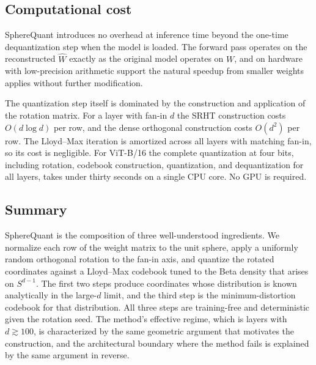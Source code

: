 \subsection{Computational cost}
\label{sec:method-cost}

SphereQuant introduces no overhead at inference time beyond the one-time
dequantization step when the model is loaded. The forward pass operates on
the reconstructed $\widehat{W}$ exactly as the original model operates on
$W$, and on hardware with low-precision arithmetic support the natural
speedup from smaller weights applies without further modification.

The quantization step itself is dominated by the construction and
application of the rotation matrix. For a layer with fan-in $d$ the SRHT
construction costs $O(d \log d)$ per row, and the dense orthogonal
construction costs $O(d^2)$ per row. The Lloyd--Max iteration is amortized
across all layers with matching fan-in, so its cost is negligible. For
ViT-B/16 the complete quantization at four bits, including rotation,
codebook construction, quantization, and dequantization for all layers,
takes under thirty seconds on a single CPU core. No GPU is required.

\subsection{Summary}
\label{sec:method-summary}

SphereQuant is the composition of three well-understood ingredients. We normalize
each row of the weight matrix to the unit sphere, apply a uniformly
random orthogonal rotation to the fan-in axis, and quantize the rotated
coordinates against a Lloyd--Max codebook tuned to the Beta density that
arises on $S^{d-1}$. The first two steps produce coordinates whose
distribution is known analytically in the large-$d$ limit, and the third
step is the minimum-distortion codebook for that distribution. All three
steps are training-free and deterministic given the rotation seed. The
method's effective regime, which is layers with $d \gtrsim 100$, is
characterized by the same geometric argument that motivates the
construction, and the architectural boundary where the method fails is
explained by the same argument in reverse.
